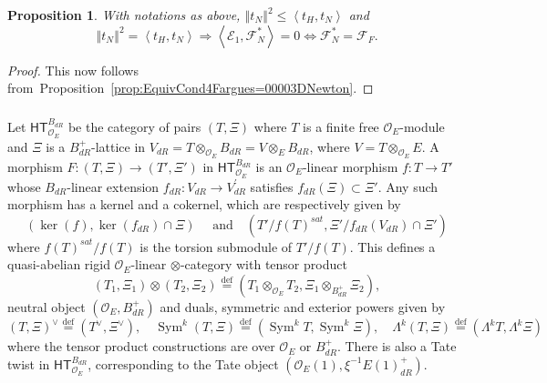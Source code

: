 \documentclass[11pt]{article}
\newtheorem{prop}[theo]{Proposition}
\theoremstyle{definition}
\numberwithin{equation}{section}
\numberwithin{figure}{section}
\numberwithin{table}{section}
\newcommand{\HT}{\mathsf{HT}}
\DeclareMathOperator{\Sym}{Sym}
\newcommand{\eqd}{\stackrel{\mathrm{def}}{=}}
\newcommand*{\dR}{dR}
\begin{document}
\begin{prop}\label{prop:Crit4Fargues=00003DNewton}
With notations as above, $\left\Vert t_{N}\right\Vert ^{2}\leq\left\langle t_{H},t_{N}\right\rangle $ and
\[
\left\Vert t_{N}\right\Vert ^{2}=\left\langle t_{H},t_{N}\right\rangle \Longrightarrow\left\langle \mathcal{E}_{1},\mathcal{F}_{N}^{\ast}\right\rangle =0\iff\mathcal{F}_{N}^{\ast}=\mathcal{F}_{F}.
\]
\end{prop}
\begin{proof}
This now follows from~Proposition~\ref{prop:EquivCond4Fargues=00003DNewton}.
\end{proof}

\subsubsection{}

Let $\HT_{\mathcal{O}_{E}}^{B_{\dR}}$ be the category of pairs $(T,\Xi)$ where $T$ is a finite free $\mathcal{O}_{E}$-module and $\Xi$ is a $B_{\dR}^{+}$-lattice in $V_{\dR}=T\otimes_{\mathcal{O}_{E}}B_{\dR}=V\otimes_{E}B_{\dR}$, where $V=T\otimes_{\mathcal{O}_{E}}E$. A morphism $F:(T,\Xi)\rightarrow(T',\Xi')$ in $\HT_{\mathcal{O}_{E}}^{B_{\dR}}$ is an $\mathcal{O}_{E}$-linear morphism $f:T\rightarrow T'$ whose $B_{\dR}$-linear extension $f_{\dR}:V_{\dR}\rightarrow V_{\dR}^{\prime}$ satisfies $f_{\dR}(\Xi)\subset\Xi'$. Any such morphism has a kernel and a cokernel, which are respectively given by
\[
\left(\ker(f),\ker(f_{\dR})\cap\Xi\right)\quad\text{ and}\quad\left(T'/f(T)^{sat},\Xi'/f_{\dR}(V_{\dR})\cap\Xi'\right)
\]
where $f(T)^{sat}/f(T)$ is the torsion submodule of $T'/f(T)$. This defines a quasi-abelian rigid $\mathcal{O}_{E}$-linear $\otimes$-category with tensor product
\[
(T_{1},\Xi_{1})\otimes(T_{2},\Xi_{2})\eqd(T_{1}\otimes_{\mathcal{O}_{E}}T_{2},\Xi_{1}\otimes_{B_{\dR}^{+}}\Xi_{2}),
\]
neutral object $(\mathcal{O}_{E},B_{\dR}^{+})$ and duals, symmetric and exterior powers given by
\[
(T,\Xi)^{\vee}\eqd(T^{\vee},\Xi^{\vee}),\quad\Sym^{k}(T,\Xi)\eqd(\Sym^{k}T,\Sym^{k}\Xi),\quad\Lambda^{k}(T,\Xi)\eqd(\Lambda^{k}T,\Lambda^{k}\Xi)
\]
where the tensor product constructions are over $\mathcal{O}_{E}$ or $B_{\dR}^{+}$. There is also a Tate twist in $\HT_{\mathcal{O}_{E}}^{B_{\dR}}$, corresponding to the Tate object $(\mathcal{O}_{E}(1),\xi^{-1}E(1)_{\dR}^{+})$.

\subsubsection{}
\end{document}
